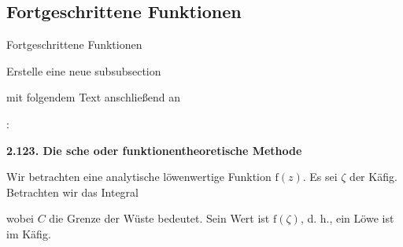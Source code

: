 \documentclass["WS\space 16-17\space -\space LaTeX-Kurs\space -\space Praesentation\space -\space 1.tex"]{subfiles}
\begin{document}
\subsection{Fortgeschrittene Funktionen}
\begin{frame}[c]
	\begin{center}
		\large Fortgeschrittene Funktionen
	\end{center}
\end{frame}
\begin{frame}[fragile]
	\Aufgabee
		Erstelle eine neue subsubsection
		
		\textrm{}
		
		mit folgendem Text anschließend an
		
		\textrm{}:
	\begin{outputbox}
		{ \large\textbf{2.123. Die  sche oder funktionentheoretische Methode}}
		
		Wir betrachten eine analytische löwenwertige Funktion $\mathrm{f}(z)$. Es sei $\zeta$ der Käfig. Betrachten wir das Integral
		
	    wobei $C$ die Grenze der Wüste bedeutet. Sein Wert ist $\mathrm{f}(\zeta)$, d. h., ein Löwe ist im Käfig.		
	\end{outputbox}
	\vspace{0.3cm}
\end{frame}
\end{document}

